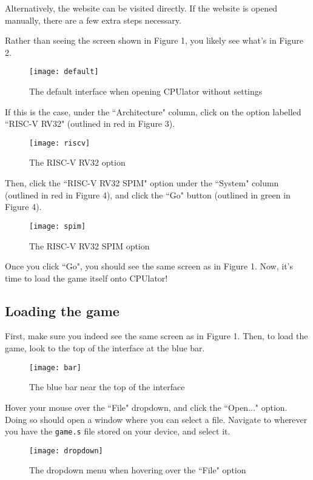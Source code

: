 \documentclass{article}
\begin{document}
Alternatively, the website can be visited directly.
If the website is opened manually, there are a few extra steps necessary.

Rather than seeing the screen shown in Figure 1, you likely see what's in Figure 2.

\begin{figure}[ht]
    \centering
    \texttt{[image: default]}
    \caption{The default interface when opening CPUlator without settings}
\end{figure}

\newpage
If this is the case, under the ``Architecture" column,
click on the option labelled ``RISC-V RV32" (outlined in red in Figure 3).

\begin{figure}[ht]
    \centering
    \texttt{[image: riscv]}
    \caption{The RISC-V RV32 option}
\end{figure}

Then, click the ``RISC-V RV32 SPIM" option under the ``System" column
(outlined in red in Figure 4), and click the ``Go" button (outlined in green in Figure 4).

\begin{figure}[ht]
    \centering
    \texttt{[image: spim]}
    \caption{The RISC-V RV32 SPIM option}
\end{figure}

Once you click ``Go", you should see the same screen as in Figure 1.
Now, it's time to load the game itself onto CPUlator!

\subsection{Loading the game}

First, make sure you indeed see the same screen as in Figure 1.
Then, to load the game, look to the top of the interface at the blue bar.

\begin{figure}[ht]
    \centering
    \texttt{[image: bar]}
    \caption{The blue bar near the top of the interface}
\end{figure}

Hover your mouse over the ``File" dropdown, and click the ``Open..." option.
Doing so should open a window where you can select a file.
Navigate to wherever you have the \texttt{game.s} file stored on your device, and select it.

\begin{figure}[ht]
    \centering
    \texttt{[image: dropdown]}
    \caption{The dropdown menu when hovering over the ``File" option}
\end{figure}
\end{document}

